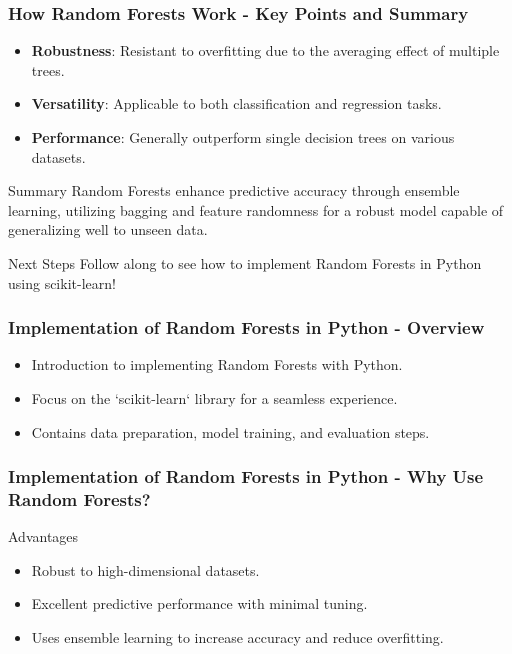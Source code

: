 \documentclass[aspectratio=169]{beamer}
\begin{document}
\begin{frame}[fragile]
    \frametitle{How Random Forests Work - Key Points and Summary}
    \begin{itemize}
        \item \textbf{Robustness}: Resistant to overfitting due to the averaging effect of multiple trees.
        \item \textbf{Versatility}: Applicable to both classification and regression tasks.
        \item \textbf{Performance}: Generally outperform single decision trees on various datasets.
    \end{itemize}

    \begin{block}{Summary}
        Random Forests enhance predictive accuracy through ensemble learning, utilizing bagging and feature randomness for a robust model capable of generalizing well to unseen data.
    \end{block}

    \begin{block}{Next Steps}
        Follow along to see how to implement Random Forests in Python using scikit-learn!
    \end{block}
\end{frame}

\begin{frame}
    \frametitle{Implementation of Random Forests in Python - Overview}
    \begin{itemize}
        \item Introduction to implementing Random Forests with Python.
        \item Focus on the `scikit-learn` library for a seamless experience.
        \item Contains data preparation, model training, and evaluation steps.
    \end{itemize}
\end{frame}

\begin{frame}
    \frametitle{Implementation of Random Forests in Python - Why Use Random Forests?}
    \begin{block}{Advantages}
        \begin{itemize}
            \item Robust to high-dimensional datasets.
            \item Excellent predictive performance with minimal tuning.
            \item Uses ensemble learning to increase accuracy and reduce overfitting.
        \end{itemize}
    \end{block}
\end{frame}
\end{document}
